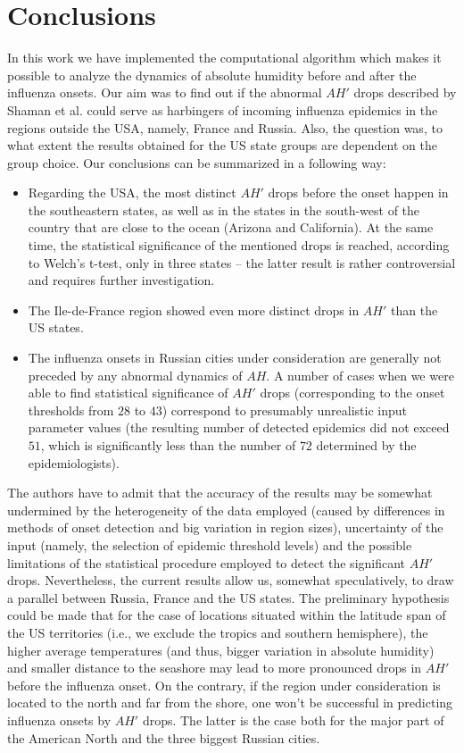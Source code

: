 \documentclass[3p,times,procedia]{elsarticle}
\begin{document}
\section{Conclusions}

In this work we have implemented the computational algorithm which makes it possible to analyze the dynamics of absolute humidity before and after the influenza onsets. Our aim was to find out if the abnormal $AH'$ drops described by Shaman et al. could serve as harbingers of incoming influenza epidemics in the regions outside the USA, namely, France and Russia. Also, the question was, to what extent the results obtained for the US state groups are dependent on the group choice. Our conclusions can be summarized in a following way:

\begin{itemize}
\item Regarding the USA, the most distinct $AH'$ drops before the onset happen in the southeastern states, as well as in the states in the south-west of the country that are close to the ocean (Arizona and California). At the same time, the statistical significance of the mentioned drops is reached, according to Welch's t-test, only in three states -- the latter result is rather controversial and requires further investigation.

\item The Ile-de-France region showed even more distinct drops in $AH'$ than the US states.

\item The influenza onsets in Russian cities under consideration are generally not preceded by any abnormal dynamics of $AH$. A number of cases when we were able to find statistical significance of $AH'$ drops (corresponding to the onset thresholds from $28$ to $43$) correspond to presumably unrealistic input parameter values (the resulting number of detected epidemics did not exceed $51$, which is significantly less than the number of $72$ determined by the epidemiologists).
\end{itemize}

The authors have to admit that the accuracy of the results may be somewhat undermined by the heterogeneity of the data employed (caused by differences in methods of onset detection and big variation in region sizes), uncertainty of the input (namely, the selection of epidemic threshold levels) and the possible limitations of the statistical procedure employed to detect the significant $AH'$ drops. Nevertheless, the current results allow us, somewhat speculatively, to draw a parallel between Russia, France and the US states. The preliminary hypothesis could be made that for the case of locations situated within the latitude span of the US territories (i.e., we exclude the tropics and southern hemisphere), the higher average temperatures (and thus, bigger variation in absolute humidity) and smaller distance to the seashore may lead to more pronounced drops in $AH'$ before the influenza onset. On the contrary, if the region under consideration is located to the north and far from the shore, one won't be successful in predicting influenza onsets by $AH'$ drops. The latter is the case both for the major part of the American North and the three biggest Russian cities.
\end{document}
